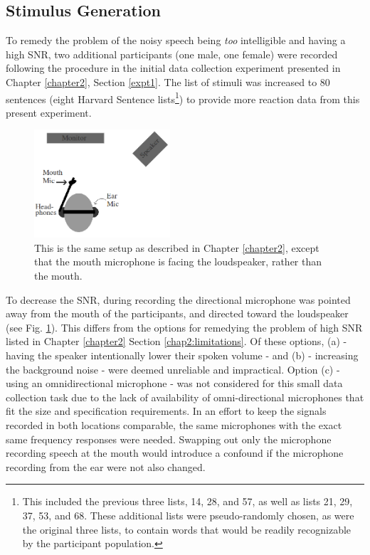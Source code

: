\subsection{Stimulus Generation}
\label{chap3:methods:stimuli}

To remedy the problem of the noisy speech being \textit{too} intelligible and having a high SNR, 
two additional participants (one male, one female) were recorded following the procedure in the initial data collection experiment presented in Chapter \ref{chapter2}, Section \ref{expt1}.  The list of stimuli was increased to 80 sentences (eight Harvard Sentence lists\footnote{This included the previous three lists, 14, 28, and 57, as well as lists 21, 29, 37, 53, and 68. These additional lists were pseudo-randomly chosen, as were the original three lists, to contain words that would be readily recognizable by the participant population.}) to provide more reaction data from this present experiment.  

  
%
\begin{figure}
\centering
  \includegraphics[width=0.45\textwidth]{figure/overallSetUp_new.png}
  \caption{This is the same setup as described in Chapter \ref{chapter2}, except that the mouth microphone is facing the loudspeaker, rather than the mouth.}
  \label{fig:overallSetUp_new}
\end{figure}
%
To decrease the SNR, during recording the directional microphone was pointed away from the mouth of the participants, and directed toward the loudspeaker (see Fig. \ref{fig:overallSetUp_new}).  This differs from the options for remedying the problem of high SNR listed in Chapter \ref{chapter2} Section \ref{chap2:limitations}.  Of these options, (a) - having the speaker intentionally lower their spoken volume - and (b) - increasing the background noise - were deemed unreliable and impractical.
Option (c) - using an omnidirectional microphone - was not considered for this small data collection task due to the lack of availability of omni-directional microphones that fit the size and specification requirements.  In an effort to keep the signals recorded in both locations comparable, the same microphones with the exact same frequency responses were needed.  Swapping out only the microphone recording speech at the mouth would introduce a confound if the microphone recording from the ear were not also changed.


